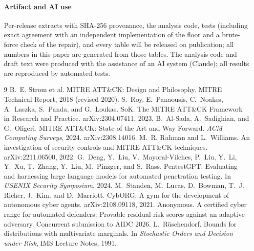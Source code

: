 \documentclass[conference,compsoc]{IEEEtran}
\begin{document}
\paragraph{Artifact and AI use} Per-release extracts with SHA-256 provenance, the
analysis code, tests (including exact agreement with an independent implementation of
the floor and a brute-force check of the repair), and every table will be released on
publication; all numbers in this paper are generated from those tables. The analysis code and draft
text were produced with the assistance of an AI system (Claude); all results are
reproduced by automated tests.

\begin{thebibliography}{9}
 B.~E. Strom et al.
\newblock MITRE ATT\&CK: Design and Philosophy.
\newblock MITRE Technical Report, 2018 (revised 2020).
 S.~Roy, E.~Panaousis, C.~Noakes, A.~Laszka, S.~Panda, and G.~Loukas.
\newblock SoK: The MITRE ATT\&CK Framework in Research and Practice.
\newblock arXiv:2304.07411, 2023.
 B.~Al-Sada, A.~Sadighian, and G.~Oligeri.
\newblock MITRE ATT\&CK: State of the Art and Way Forward.
\newblock \emph{ACM Computing Surveys}, 2024. arXiv:2308.14016.
 M.~R. Rahman and L.~Williams.
\newblock An investigation of security controls and MITRE ATT\&CK techniques.
\newblock arXiv:2211.06500, 2022.
 G.~Deng, Y.~Liu, V.~Mayoral-Vilches, P.~Liu, Y.~Li, Y.~Xu,
T.~Zhang, Y.~Liu, M.~Pinzger, and S.~Rass.
\newblock PentestGPT: Evaluating and harnessing large language models for automated
penetration testing.
\newblock In \emph{USENIX Security Symposium}, 2024.
 M.~Standen, M.~Lucas, D.~Bowman, T.~J. Richer, J.~Kim, and
D.~Marriott.
\newblock CybORG: A gym for the development of autonomous cyber agents.
\newblock arXiv:2108.09118, 2021.
 Anonymous.
\newblock A certified cyber range for automated defenders: Provable residual-risk scores
against an adaptive adversary.
\newblock Concurrent submission to AIDC 2026.
 L.~R\"uschendorf.
\newblock Bounds for distributions with multivariate marginals.
\newblock In \emph{Stochastic Orders and Decision under Risk}, IMS Lecture Notes, 1991.
\end{thebibliography}

\appendices
\end{document}
